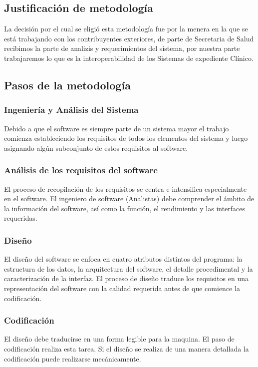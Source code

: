   \subsection{Justificación de metodología}

  La decisión por el cual se eligió esta metodología fue por la menera en la que se está trabajando con los contribuyentes exteriores, de parte de Secretaria de Salud recibimos la parte de analizis y requerimientos del sistema, por nuestra parte trabajaremos lo que es la interoperabilidad de los Sistemas de expediente Clínico.
        \subsection{Pasos de la metodología}
            \subsubsection{Ingeniería y Análisis del Sistema}
            Debido a que el software es siempre parte de un sistema mayor el trabajo comienza estableciendo los requisitos de todos los elementos del sistema y luego asignando algún subconjunto de estos requisitos al software.
            \subsubsection{Análisis de los requisitos del software}
            El proceso de recopilación de los requisitos se centra e intensifica especialmente en el software. El ingeniero de software (Analistas) debe comprender el ámbito de la información del software, así como la función, el rendimiento y las interfaces requeridas.
            \subsubsection{Diseño}
            El diseño del software se enfoca en cuatro atributos distintos del programa: la estructura de los datos, la arquitectura del software, el detalle procedimental y la caracterización de la interfaz. El proceso de diseño traduce los requisitos en una representación del software con la calidad requerida antes de que comience la codificación.
            \subsubsection{Codificación}
            El diseño debe traducirse en una forma legible para la maquina. El paso de codificación realiza esta tarea. Si el diseño se realiza de una manera detallada la codificación puede realizarse mecánicamente.
